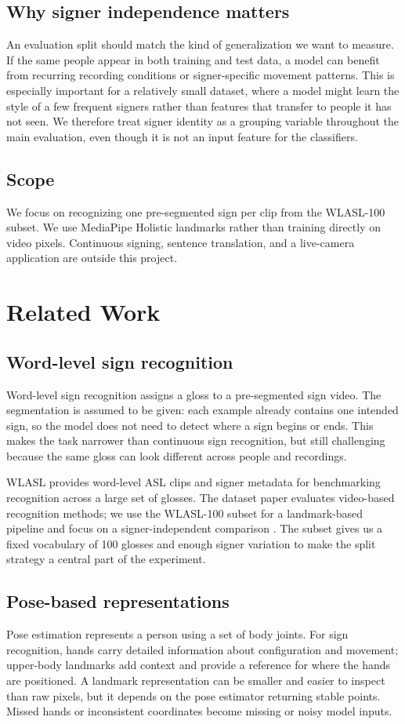 \documentclass[12pt,a4paper,oneside]{report}
\begin{document}
\section{Why signer independence matters}
An evaluation split should match the kind of generalization we want to measure. If the same people appear in both training and test data, a model can benefit from recurring recording conditions or signer-specific movement patterns. This is especially important for a relatively small dataset, where a model might learn the style of a few frequent signers rather than features that transfer to people it has not seen. We therefore treat signer identity as a grouping variable throughout the main evaluation, even though it is not an input feature for the classifiers.

\section{Scope}
We focus on recognizing one pre-segmented sign per clip from the WLASL-100 subset. We use MediaPipe Holistic landmarks rather than training directly on video pixels. Continuous signing, sentence translation, and a live-camera application are outside this project.

\chapter{Related Work}
\section{Word-level sign recognition}
Word-level sign recognition assigns a gloss to a pre-segmented sign video. The segmentation is assumed to be given: each example already contains one intended sign, so the model does not need to detect where a sign begins or ends. This makes the task narrower than continuous sign recognition, but still challenging because the same gloss can look different across people and recordings.

WLASL provides word-level ASL clips and signer metadata for benchmarking recognition across a large set of glosses. The dataset paper evaluates video-based recognition methods; we use the WLASL-100 subset for a landmark-based pipeline and focus on a signer-independent comparison \cite{li2020wlasl}. The subset gives us a fixed vocabulary of 100 glosses and enough signer variation to make the split strategy a central part of the experiment.

\section{Pose-based representations}
Pose estimation represents a person using a set of body joints. For sign recognition, hands carry detailed information about configuration and movement; upper-body landmarks add context and provide a reference for where the hands are positioned. A landmark representation can be smaller and easier to inspect than raw pixels, but it depends on the pose estimator returning stable points. Missed hands or inconsistent coordinates become missing or noisy model inputs.
\end{document}
